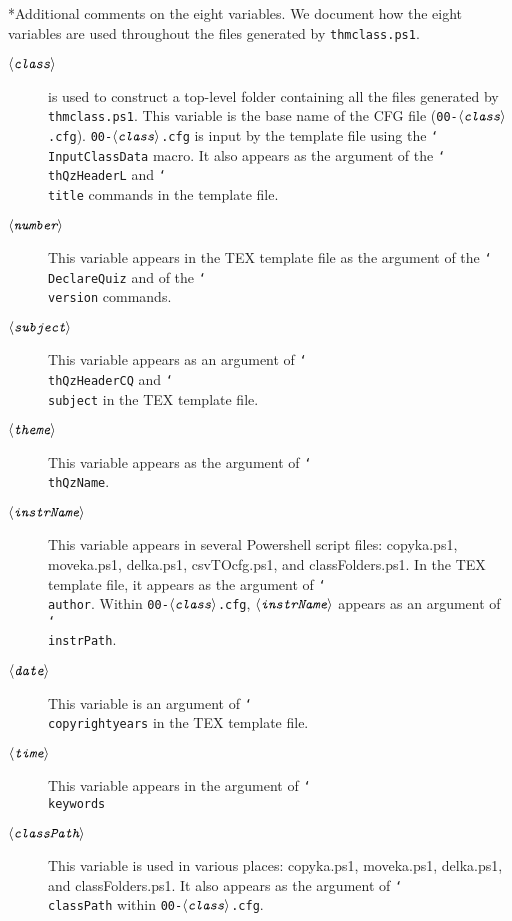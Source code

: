 \documentclass{article}
\makeatletter
\def\cs#1{\texttt{\char`\\#1}}
\let\app\textsf
\let\uif\textsf
\def\thescript{\texttt{thmclass.ps1}}
\def\ameta#1{\ensuremath{\langle\textit{\texttt{#1}}\rangle}}
\renewcommand{\paragraph}
    {\@startsection{paragraph}{4}{0pt}{6pt}{-3pt}{\bfseries}}
\makeatother
\begin{document}
\paragraph*{Additional comments on the eight variables.} We
document how the eight variables are used throughout the files generated by
\thescript.
\begin{description}
  \item[\normalfont\ameta{class}] is used to construct a top-level folder
      containing all the files generated by \thescript. This
      variable is the base name of the CFG file
      (\texttt{00-\ameta{class}.cfg}).
      \texttt{00-\ameta{class}.cfg} is input by the template
      file using the \cs{InputClassData} macro. It also
      appears as the argument of the \cs{thQzHeaderL} and
      \cs{title} commands in the template file.

  \item[\normalfont\ameta{number}] This variable appears in the TEX template file as
      the argument of the \cs{DeclareQuiz} and of the \cs{version} commands.

  \item[\normalfont\ameta{subject}] This variable appears as an argument
      of \cs{thQzHeaderCQ} and \cs{subject} in the TEX
      template file.

  \item[\normalfont\ameta{theme}] This variable appears as the argument of \cs{thQzName}.

  \item[\normalfont\ameta{instrName}]  This variable appears in several
      \uif{Powershell} script files: \app{copyka.ps1}, \app{moveka.ps1},
      \app{delka.ps1}, \app{csvTOcfg.ps1}, and \app{classFolders.ps1}. In
      the TEX template file, it appears as the argument of \cs{author}.
      Within \texttt{00-\ameta{class}.cfg}, \ameta{instrName} appears as an
      argument of \cs{instrPath}.

  \item[\normalfont\ameta{date}] This variable is an argument of
      \cs{copyrightyears} in the TEX template file.

  \item[\normalfont\ameta{time}] This variable appears in the argument of \cs{keywords}

  \item[\normalfont\ameta{classPath}] This variable is used in various
      places: \app{copyka.ps1}, \app{moveka.ps1},
      \app{delka.ps1}, and \app{classFolders.ps1}. It also
      appears as the argument of \cs{classPath} within
      \texttt{00-\ameta{class}.cfg}.

\end{description}
\end{document}
